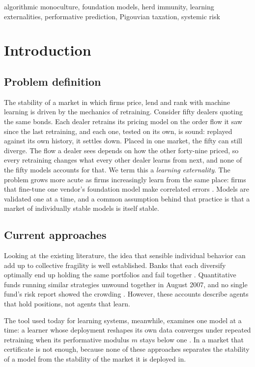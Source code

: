 \documentclass[conference]{IEEEtran}
\theoremstyle{plain}
\begin{document}
\begin{IEEEkeywords}
algorithmic monoculture, foundation models, herd immunity, learning externalities, performative prediction, Pigouvian taxation, systemic risk
\end{IEEEkeywords}

\section{Introduction}
\label{sec:intro}

\subsection{Problem definition}
The stability of a market in which firms price, lend and rank with machine learning is driven by the mechanics of retraining. Consider fifty dealers quoting the same bonds. Each dealer retrains its pricing model on the order flow it saw since the last retraining, and each one, tested on its own, is sound: replayed against its own history, it settles down. Placed in one market, the fifty can still diverge. The flow a dealer sees depends on how the other forty-nine priced, so every retraining changes what every other dealer learns from next, and none of the fifty models accounts for that. We term this a \emph{learning externality}. The problem grows more acute as firms increasingly learn from the same place: firms that fine-tune one vendor's foundation model make correlated errors \cite{kim2025}. Models are validated one at a time, and a common assumption behind that practice is that a market of individually stable models is itself stable.

\subsection{Current approaches}
Looking at the existing literature, the idea that sensible individual behavior can add up to collective fragility is well established. Banks that each diversify optimally end up holding the same portfolios and fail together \cite{beale2011,wagner2010}. Quantitative funds running similar strategies unwound together in August 2007, and no single fund's risk report showed the crowding \cite{khandani2007}. However, these accounts describe agents that hold positions, not agents that learn.

The tool used today for learning systems, meanwhile, examines one model at a time: a learner whose deployment reshapes its own data converges under repeated retraining when its performative modulus $m$ stays below one \cite{perdomo2020}. In a market that certificate is not enough, because none of these approaches separates the stability of a model from the stability of the market it is deployed in.
\end{document}
